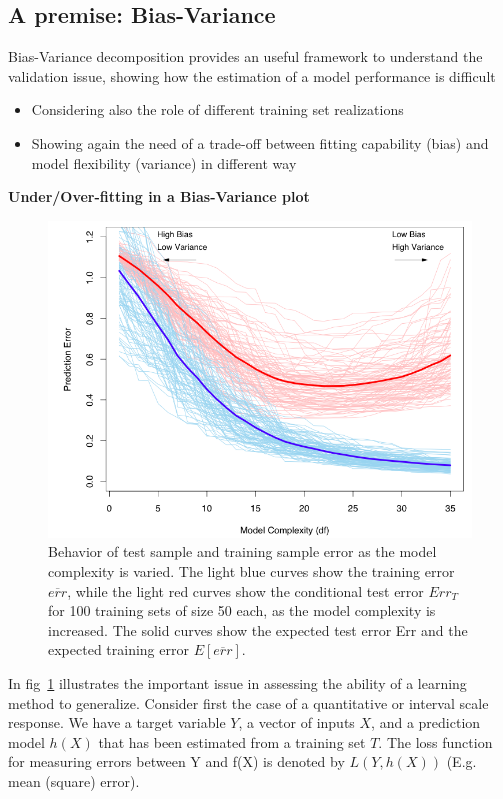 \documentclass[../main.tex]{subfiles}
\begin{document}
\subsection{A premise: Bias-Variance}
Bias-Variance decomposition provides an useful framework to understand the validation issue, showing how the estimation of a model performance is difficult
\begin{itemize}
    \item Considering also the role of different training set realizations
    \item Showing again the need of a trade-off between fitting capability (bias) and model flexibility (variance) in different way
\end{itemize}

\noindent \textbf{Under/Over-fitting in a Bias-Variance plot}
\begin{figure}[H]
    \centering
    \includegraphics[scale = 0.4]{lectures/5_validation/5_bias_oufit_plot.png}
    \caption{Behavior of test sample and training sample error as the model complexity is varied. The light blue curves show the training error $\overline{err}$, while the light red curves show the conditional test error $Err_T$ for 100 training sets of size 50 each, as the model complexity is increased. The solid curves show the expected test error Err and the expected training error $E[\overline{err}]$.}
    \label{fig:5_bias_oufit_plot}
\end{figure}

In fig~\ref{fig:5_bias_oufit_plot} illustrates the important issue in assessing the ability of a learning method to generalize. Consider first the case of a quantitative or interval scale response. We have a target variable $Y$, a vector of inputs $X$, and a
prediction model $h(X)$ that has been estimated from a training set $T$.
The loss function for measuring errors between Y and f(X) is denoted by 
$L(Y,h(X))$ (E.g. mean (square) error).
\end{document}
